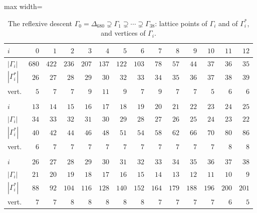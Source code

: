 \documentclass[manuscript]{aomart}
\theoremstyle{definition}
\theoremstyle{remark}
\newcommand{\Dbig}{\Delta_{680}}
\begin{document}
\begin{table}[t]
\caption{The reflexive descent $\Gamma_0=\Dbig\supsetneq\Gamma_1\supsetneq
\cdots\supsetneq\Gamma_{38}$: lattice points of $\Gamma_i$ and of
$\Gamma_i^*$, and vertices of $\Gamma_i$.}\label{tab:chain}
\centering
\begin{adjustbox}{max width=\linewidth}\begin{tabular}{lrrrrrrrrrrrrr}
\toprule
$i$ & $0$ & $1$ & $2$ & $3$ & $4$ & $5$ & $6$ & $7$ & $8$ & $9$ & $10$ & $11$ & $12$\\
\midrule
$|\Gamma_i|$ & $680$ & $422$ & $236$ & $207$ & $137$ & $122$ & $103$ & $78$ & $57$ & $44$ & $37$ & $36$ & $35$\\
$|\Gamma_i^*|$ & $26$ & $27$ & $28$ & $29$ & $30$ & $32$ & $33$ & $34$ & $35$ & $36$ & $37$ & $38$ & $39$\\
vert. & $5$ & $7$ & $7$ & $9$ & $11$ & $9$ & $7$ & $9$ & $7$ & $7$ & $5$ & $6$ & $6$\\
 &  &  &  &  &  &  &  &  &  &  &  &  & \\
$i$ & $13$ & $14$ & $15$ & $16$ & $17$ & $18$ & $19$ & $20$ & $21$ & $22$ & $23$ & $24$ & $25$\\
$|\Gamma_i|$ & $34$ & $33$ & $32$ & $31$ & $30$ & $29$ & $28$ & $27$ & $26$ & $25$ & $24$ & $23$ & $22$\\
$|\Gamma_i^*|$ & $40$ & $42$ & $44$ & $46$ & $48$ & $51$ & $54$ & $58$ & $62$ & $66$ & $70$ & $80$ & $86$\\
vert. & $6$ & $7$ & $7$ & $7$ & $7$ & $7$ & $7$ & $7$ & $7$ & $7$ & $7$ & $8$ & $8$\\
 &  &  &  &  &  &  &  &  &  &  &  &  & \\
$i$ & $26$ & $27$ & $28$ & $29$ & $30$ & $31$ & $32$ & $33$ & $34$ & $35$ & $36$ & $37$ & $38$\\
$|\Gamma_i|$ & $21$ & $20$ & $19$ & $18$ & $17$ & $16$ & $15$ & $14$ & $13$ & $12$ & $11$ & $10$ & $9$\\
$|\Gamma_i^*|$ & $88$ & $92$ & $104$ & $116$ & $128$ & $140$ & $152$ & $164$ & $179$ & $188$ & $196$ & $200$ & $201$\\
vert. & $7$ & $7$ & $8$ & $8$ & $8$ & $8$ & $8$ & $7$ & $7$ & $7$ & $7$ & $6$ & $5$\\
\bottomrule
\end{tabular}\end{adjustbox}
\end{table}
\end{document}
